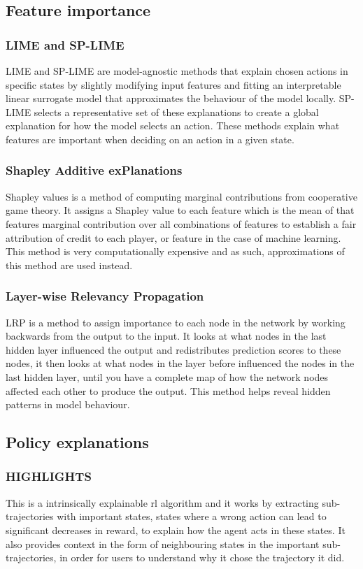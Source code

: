 \documentclass[UKenglish]{uiomasterthesis}
\begin{document}
\subsection{Feature importance}


\subsubsection{LIME and SP-LIME}
LIME and SP-LIME are model-agnostic methods that explain chosen actions in specific states by slightly modifying input features and fitting an interpretable linear surrogate model that approximates the behaviour of the model locally. SP-LIME selects a representative set of these explanations to create a global explanation for how the model selects an action. These methods explain what features are important when deciding on an action in a given state.

\subsubsection{Shapley Additive exPlanations}
Shapley values is a method of computing marginal contributions from cooperative game theory. It assigns a Shapley value to each feature which is the mean of that features marginal contribution over all combinations of features to establish a fair attribution of credit to each player, or feature in the case of machine learning. This method is very computationally expensive and as such, approximations of this method are used instead.

\subsubsection{Layer-wise Relevancy Propagation}
LRP is a method to assign importance to each node in the network by working backwards from the output to the input. It looks at what nodes in the last hidden layer influenced the output and redistributes prediction scores to these nodes, it then looks at what nodes in the layer before influenced the nodes in the last hidden layer, until you have a complete map of how the network nodes affected each other to produce the output. This method helps reveal hidden patterns in model behaviour.

\subsection{Policy explanations}

\subsubsection{HIGHLIGHTS}
This is a intrinsically explainable \ac{rl} algorithm and it works by extracting sub-trajectories with important states, states where a wrong action can lead to significant decreases in reward, to explain how the agent acts in these states. It also provides context in the form of neighbouring states in the important sub-trajectories, in order for users to understand why it chose the trajectory it did.
\end{document}
